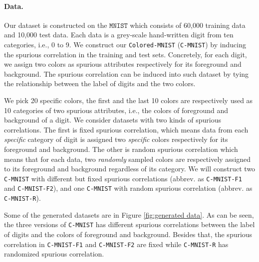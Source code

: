 \paragraph{Data.} Our dataset is constructed on the $\texttt{MNIST}$ \citep{lecun1998gradient} which consists of 60,000 training data and 10,000 test data. Each data is a grey-scale hand-written digit from ten categories, i.e., 0 to 9. We construct our \texttt{Colored-MNIST} (\texttt{C-MNIST}) by inducing the spurious correlation in the training and test sets. Concretely, for each digit, we assign two colors as spurious attributes respectively for its foreground and background. The spurious correlation can be induced into such dataset by tying the relationship between the label of digits and the two colors. 
\par
We pick 20 specific colors, the first and the last 10 colors are respectively used as 10 categories of two spurious attributes, i.e., the colors of foreground and background of a digit. We consider datasets with two kinds of spurious correlations. The first is fixed spurious correlation, which means data from each \emph{specific} category of digit is assigned two \emph{specific} colors respectively for its foreground and background. The other is random spurious correlation which means that for each data, two \emph{randomly} sampled colors are respectively assigned to its foreground and background regardless of its category. We will construct two \texttt{C-MNIST} with different but fixed spurious correlations (abbrev. as \texttt{C-MNIST-F1} and \texttt{C-MNIST-F2}), and one \texttt{C-MNIST} with random spurious correlation (abbrev. as \texttt{C-MNIST-R}). 
\par
Some of the generated datasets are in Figure \ref{fig:generated data}. As can be seen, the three versions of \texttt{C-MNIST} has different spurious correlations between the label of digits and the colors of foreground and background. Besides that, the spurious correlation in \texttt{C-MNIST-F1} and \texttt{C-MNIST-F2} are fixed while \texttt{C-MNIST-R} has randomized spurious correlation. 

